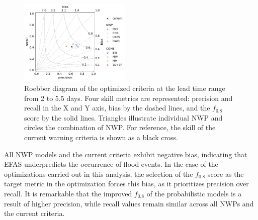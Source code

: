 \documentclass{ametsocV6.1}
\begin{document}
\begin{figure}
    \centering
    \includegraphics[width=0.475\textwidth]{figureC1.pdf}
    \caption{Roebber diagram of the optimized criteria at the lead time range from 2 to 5.5 days. Four skill metrics are represented: precision and recall in the X and Y axis, bias by the dashed lines, and the $f_{0.8}$ score by the solid lines. Triangles illustrate individual NWP and circles the combination of NWP. For reference, the skill of the current warning criteria is shown as a black cross.}
    \label{fig:roebber}
\end{figure}

All NWP models and the current criteria exhibit negative bias, indicating that EFAS underpredicts the occurrence of flood events. In the case of the optimizations carried out in this analysis, the selection of the $f_{0.8}$ score as the target metric in the optimization forces this bias, as it prioritizes precision over recall. It is remarkable that the improved $f_{0.8}$ of the probabilistic models is a result of higher precision, while recall values remain similar across all NWPs and the current criteria.






\end{document}
